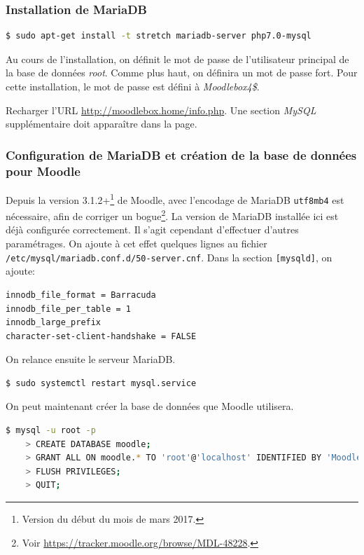 \documentclass[11pt]{article}
\begin{document}
\subsubsection{Installation de MariaDB}

\begin{lstlisting}[language=bash]
$ sudo apt-get install -t stretch mariadb-server php7.0-mysql
\end{lstlisting}

Au cours de l'installation, on définit le mot de passe de l'utilisateur principal de la base de données \emph{root}. Comme plus haut,  on définira un mot de passe fort. Pour cette installation, le mot de passe est défini à \emph{Moodlebox4\$}.

\begin{verification}
Recharger l'URL \url{http://moodlebox.home/info.php}. Une section \emph{MySQL} supplémentaire doit apparaître dans la page.
\end{verification}

\subsubsection{Configuration de MariaDB et création de la base de données pour Moodle}

Depuis la version 3.1.2+\footnote{Version du début du mois de mars 2017.} de Moodle, avec l'encodage de MariaDB \lstinline{utf8mb4} est nécessaire, afin de corriger un bogue\footnote{Voir \url{https://tracker.moodle.org/browse/MDL-48228}.}. La version de MariaDB installée ici est déjà configurée correctement. Il s'agit cependant d'effectuer d'autres paramétrages. On ajoute à cet effet quelques lignes au fichier \lstinline{/etc/mysql/mariadb.conf.d/50-server.cnf}. Dans la section \lstinline{[mysqld]}, on ajoute:
\begin{lstlisting}[language=bash]
innodb_file_format = Barracuda
innodb_file_per_table = 1
innodb_large_prefix
character-set-client-handshake = FALSE
\end{lstlisting}

On relance ensuite le serveur MariaDB.
\begin{lstlisting}[language=bash]
$ sudo systemctl restart mysql.service
\end{lstlisting}

On peut maintenant créer la base de données que Moodle utilisera.

\begin{lstlisting}[language=bash]
$ mysql -u root -p
    > CREATE DATABASE moodle;
    > GRANT ALL ON moodle.* TO 'root'@'localhost' IDENTIFIED BY 'Moodlebox4$';
    > FLUSH PRIVILEGES;
    > QUIT;
\end{lstlisting}
\end{document}
